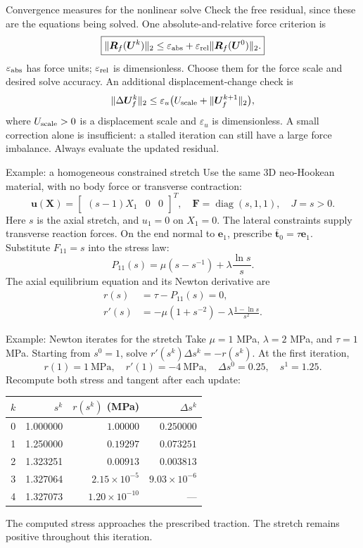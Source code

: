 \documentclass[11pt,aspectratio=169]{beamer}
\newcommand{\bu}{\bm u}
\newcommand{\bF}{\bm F}
\newcommand{\bt}{\bm t}
\newcommand{\bX}{\bm X}
\newcommand{\bU}{\bm U}
\newcommand{\bR}{\bm R}
\DeclareMathOperator{\diag}{diag}
\begin{document}
\begin{frame}{Convergence measures for the nonlinear solve}
Check the free residual, since these are the equations being solved.
One absolute-and-relative force criterion is
\[
\boxed{\|\bR_f(\bU^k)\|_2
\le\varepsilon_{\rm abs}
+\varepsilon_{\rm rel}\|\bR_f(\bU^0)\|_2.}
\]
$\varepsilon_{\rm abs}$ has force units; $\varepsilon_{\rm rel}$ is
dimensionless. Choose them for the force scale and desired solve accuracy.
An additional displacement-change check is
\[
\|\Delta\bU_f^k\|_2
\le\varepsilon_u\bigl(U_{\rm scale}+\|\bU_f^{k+1}\|_2\bigr),
\]
where $U_{\rm scale}>0$ is a displacement scale and $\varepsilon_u$
is dimensionless.
A small correction alone is insufficient: a stalled iteration can still
have a large force imbalance. Always evaluate the updated residual.
\end{frame}

\begin{frame}{Example: a homogeneous constrained stretch}
Use the same 3D neo-Hookean material, with no body force or transverse contraction:
\[
\bu(\bX)=\begin{bmatrix}(s-1)X_1&0&0\end{bmatrix}^{T},
\quad \bF=\diag(s,1,1),\quad J=s>0.
\]
Here $s$ is the axial stretch, and $u_1=0$ on $X_1=0$.
The lateral constraints supply transverse reaction forces.
On the end normal to $\bm e_1$, prescribe
$\overline{\bt}_0=\tau\bm e_1$.
Substitute $F_{11}=s$ into the stress law:
\[
P_{11}(s)=\mu(s-s^{-1})+\lambda\frac{\ln s}{s}.
\]
The axial equilibrium equation and its Newton derivative are
\[
\begin{aligned}
r(s)&=\tau-P_{11}(s)=0,\\
r'(s)&=-\mu(1+s^{-2})-\lambda\frac{1-\ln s}{s^2}.
\end{aligned}
\]
\end{frame}

\begin{frame}{Example: Newton iterates for the stretch}
Take $\mu=1$ MPa, $\lambda=2$ MPa, and $\tau=1$ MPa.
Starting from $s^0=1$, solve $r'(s^k)\Delta s^k=-r(s^k)$.
At the first iteration,
\[
r(1)=1\ \mathrm{MPa},\quad r'(1)=-4\ \mathrm{MPa},
\quad \Delta s^0=0.25,\quad s^1=1.25.
\]
Recompute both stress and tangent after each update:
\begin{center}
\setlength{\tabcolsep}{12pt}
\begin{tabular}{crrr}
\toprule
$k$ & $s^k$ & $r(s^k)$ (MPa) & $\Delta s^k$\\
\midrule
0 & 1.000000 & $1.00000$ & $0.250000$\\
1 & 1.250000 & $0.19297$ & $0.073251$\\
2 & 1.323251 & $0.00913$ & $0.003813$\\
3 & 1.327064 & $2.15\times10^{-5}$ & $9.03\times10^{-6}$\\
4 & 1.327073 & $1.20\times10^{-10}$ & ---\\
\bottomrule
\end{tabular}
\end{center}
The computed stress approaches the prescribed traction.
The stretch remains positive throughout this iteration.
\end{frame}
\end{document}
